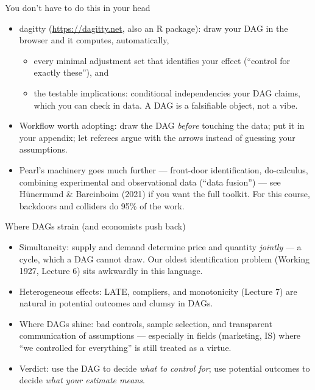 \documentclass[aspectratio=169,11pt]{beamer}
\begin{document}
\begin{frame}{You don't have to do this in your head}
\begin{itemize}
	\item \alert{dagitty} (\url{https://dagitty.net}, also an R package): draw your
	DAG in the browser and it computes, automatically,
	\begin{itemize}
		\item every \alert{minimal adjustment set} that identifies your effect
		(``control for exactly these''), and
		\item the \alert{testable implications}: conditional independencies your DAG
		claims, which you can check in data. A DAG is a falsifiable object, not a
		vibe.
	\end{itemize}

	\medskip
	\item Workflow worth adopting: draw the DAG \emph{before} touching the data;
	put it in your appendix; let referees argue with the arrows instead of guessing
	your assumptions.

	\medskip
	\item Pearl's machinery goes much further --- front-door identification,
	do-calculus, combining experimental and observational data (``data fusion'') ---
	see H\"unermund \& Bareinboim (2021) if you want the full toolkit. For this
	course, backdoors and colliders do 95\% of the work.
\end{itemize}
\end{frame}


\begin{frame}{Where DAGs strain (and economists push back)}
\begin{itemize}
	\item \alert{Simultaneity}: supply and demand determine price and quantity
	\emph{jointly} --- a cycle, which a DAG cannot draw. Our oldest identification
	problem (Working 1927, Lecture 6) sits awkwardly in this language.

	\medskip
	\item \alert{Heterogeneous effects}: LATE, compliers, and monotonicity
	(Lecture 7) are natural in potential outcomes and clumsy in DAGs.

	\medskip
	\item \alert{Where DAGs shine}: bad controls, sample selection, and transparent
	communication of assumptions --- especially in fields (marketing, IS) where
	``we controlled for everything'' is still treated as a virtue.

	\medskip
	\item Verdict: use the DAG to decide \emph{what to control for}; use potential
	outcomes to decide \emph{what your estimate means}.
\end{itemize}
\end{frame}
\end{document}
